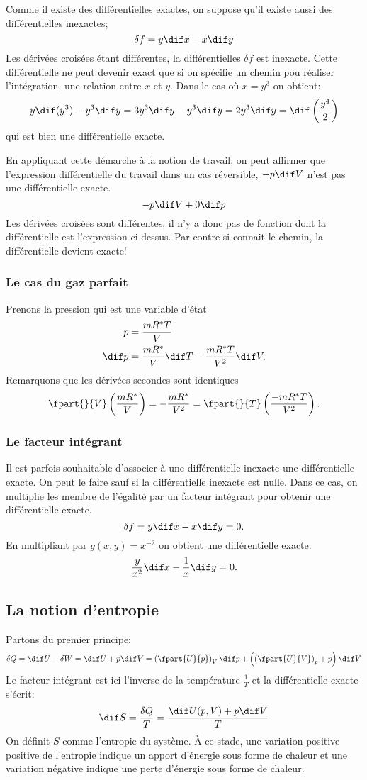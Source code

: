Comme il existe des différentielles exactes,
on suppose qu'il existe aussi des différentielles inexactes;
\[ \delta f = y\dif x - x\dif y \]
Les dérivées croisées étant différentes,
la différentielles $\delta f$ est inexacte.
Cette différentielle ne peut devenir exact que si
on spécifie un chemin pou réaliser l'intégration, une relation entre $x$ et $y$.
Dans le cas où $x = y^3$ on obtient:
\[  y\dif(y^3)-y^3\dif y = 3y^3\dif y-y^3\dif y
= 2y^3\dif y = \dif\left(\frac{y^4}{2}\right) \]
qui est bien une différentielle exacte.

En appliquant cette démarche à la notion de travail,
on peut affirmer que l'expression différentielle du travail
dans un cas réversible, $-p\dif V$ n'est pas une différentielle exacte.
\[ -p\dif V+0\dif p \]
Les dérivées croisées sont différentes,
il n'y a donc pas de fonction dont la différentielle est l'expression ci dessus.
Par contre si connait le chemin, la différentielle devient exacte!
\subsubsection{Le cas du gaz parfait}
Prenons la pression qui est une variable d'état
\begin{align*}
  p & = \frac{mR^*T}{V}\\
  \dif p & = \frac{mR^*}{V}\dif T-\frac{mR^*T}{V^2}\dif V.
\end{align*}
Remarquons que les dérivées secondes sont identiques
\[ \fpart{}{V} \left(\frac{mR^*}{V}\right) =
-\frac{mR^*}{V^2} = \fpart{}{T}
\left(\frac{-mR^*T}{V^2}\right). \]

\subsubsection{Le facteur intégrant}
Il est parfois souhaitable d'associer à une différentielle
inexacte une différentielle exacte.
On peut le faire sauf si la différentielle inexacte est nulle.
Dans ce cas, on multiplie les membre de l'égalité par un facteur intégrant
pour obtenir une différentielle exacte.
\[ \delta f = y\dif x-x\dif y = 0. \]
En multipliant par $g(x,y) = x^{-2}$ on obtient une différentielle exacte:
\[ \frac y {x^2} \dif x -\frac 1x\dif y = 0. \]
\subsection{La notion d'entropie}
Partons du premier principe:
\[ \delta Q = \dif U - \delta W = \dif U +p\dif V =
\left(\fpart{U}{p}\right)_V \dif p +
\left ( \left ( \fpart{U}{V}\right)_p + p \right)\dif V \]
Le facteur intégrant est ici l'inverse de la température
$\frac{1}{T}$ et la différentielle exacte s'écrit:
\[ \dif S = \frac{\delta Q}{T} = \frac{\dif U(p,V)+p\dif V }T \]
On définit $S$ comme l'entropie du système.
À ce stade, une variation positive positive de l'entropie
indique un apport d'énergie sous forme de chaleur et
une variation négative indique une perte d'énergie sous forme de chaleur.


